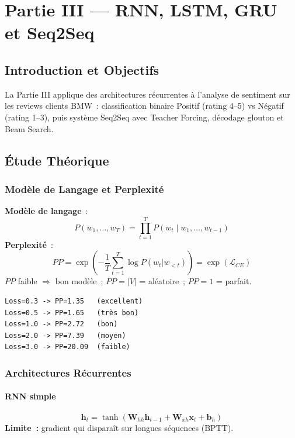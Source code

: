 \documentclass[12pt,a4paper]{report}
\begin{document}
\chapter{Partie III --- RNN, LSTM, GRU et Seq2Seq}

\section{Introduction et Objectifs}

La Partie III applique des architectures récurrentes à l'analyse de sentiment sur les 
reviews clients BMW~: classification binaire Positif (rating 4--5) vs Négatif (rating 1--3),
puis système Seq2Seq avec Teacher Forcing, décodage glouton et Beam Search.

\section{Étude Théorique}

\subsection{Modèle de Langage et Perplexité}

\begin{formulebox}
\textbf{Modèle de langage}~:
\[
  P(w_1,\ldots,w_T) = \prod_{t=1}^T P(w_t \mid w_1,\ldots,w_{t-1})
\]
\textbf{Perplexité}~:
\[
  PP = \exp\!\left(-\frac{1}{T}\sum_{t=1}^T\log P(w_t|w_{<t})\right)
     = \exp(\mathcal{L}_{CE})
\]
$PP$ faible $\Rightarrow$ bon modèle~; $PP=|V|$ = aléatoire~; $PP=1$ = parfait.
\end{formulebox}

\begin{outputbox}
\begin{verbatim}
Loss=0.3 -> PP=1.35   (excellent)
Loss=0.5 -> PP=1.65   (très bon)
Loss=1.0 -> PP=2.72   (bon)
Loss=2.0 -> PP=7.39   (moyen)
Loss=3.0 -> PP=20.09  (faible)
\end{verbatim}
\end{outputbox}

\subsection{Architectures Récurrentes}

\subsubsection{RNN simple}
\[
  \mathbf{h}_t = \tanh\!\left(\mathbf{W}_{hh}\mathbf{h}_{t-1}
  + \mathbf{W}_{xh}\mathbf{x}_t + \mathbf{b}_h\right)
\]
\textbf{Limite~:} gradient qui disparaît sur longues séquences (BPTT).
\end{document}
